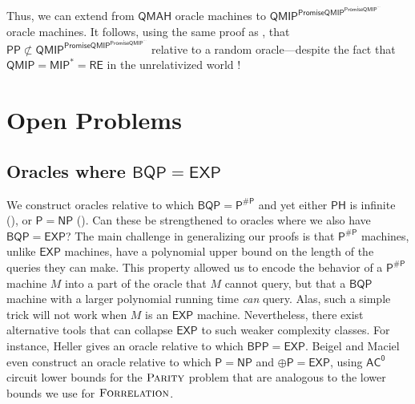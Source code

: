 \documentclass[10pt,a4paper]{article}
\newcommand{\PARITY}{\normalfont\textsc{Parity}}
\newcommand{\Forrelation}{\normalfont\textsc{Forrelation}}
\begin{document}
Thus, we can extend  from $\mathsf{QMAH}$ oracle machines to $\mathsf{QMIP}^{\mathsf{PromiseQMIP}^{\mathsf{PromiseQMIP}^{\cdots}}}$ oracle machines. It follows, using the same proof as , that $\mathsf{PP} \not\subset \mathsf{QMIP}^{\mathsf{PromiseQMIP}^{\mathsf{PromiseQMIP}^{\cdots}}}$ relative to a random oracle---despite the fact that $\mathsf{QMIP} = \mathsf{MIP}^{*}=\mathsf{RE}$ in the unrelativized world \cite{RUV13,JNVWY20}!

\section{Open Problems\label{OPEN}}

\subsection{Oracles where \texorpdfstring{$\mathsf{BQP} = \mathsf{EXP}$}{BQP = EXP}}

We construct oracles relative to which $\mathsf{BQP} = \mathsf{P}^{\mathsf{\# P}}$ and yet either $\mathsf{PH}$ is infinite (), or $\mathsf{P} = \mathsf{NP}$ (). Can these be strengthened to oracles where we also have $\mathsf{BQP} = \mathsf{EXP}$? The main challenge in generalizing our proofs is that $\mathsf{P^{\# P}}$ machines, unlike $\mathsf{EXP}$ machines, have a polynomial upper bound on the length of the queries they can make. This property allowed us to encode the behavior of a $\mathsf{P^{\# P}}$ machine $M$ into a part of the oracle that $M$ cannot query, but that a $\mathsf{BQP}$ machine with a larger polynomial running time \textit{can} query. Alas, such a simple trick will not work when $M$ is an $\mathsf{EXP}$ machine. Nevertheless, there exist alternative tools that can collapse $\mathsf{EXP}$ to such weaker complexity classes. For instance, Heller \cite{Hel86} gives an oracle relative to which $\mathsf{BPP} = \mathsf{EXP}$. Beigel and Maciel \cite{BM99} even construct an oracle relative to which $\mathsf{P} = \mathsf{NP}$ and $\mathsf{\oplus P} = \mathsf{EXP}$, using $\mathsf{AC^0}$ circuit lower bounds for the $\PARITY$ problem that are analogous to the lower bounds we use for $\Forrelation$.
\end{document}
